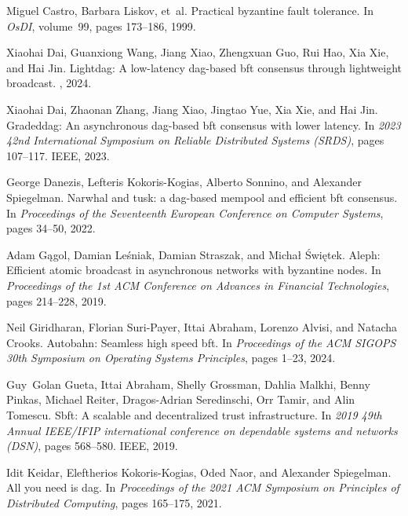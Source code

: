\begin{thebibliography}{10}
Miguel Castro, Barbara Liskov, et~al.
\newblock Practical byzantine fault tolerance.
\newblock In {\em OsDI}, volume~99, pages 173--186, 1999.

Xiaohai Dai, Guanxiong Wang, Jiang Xiao, Zhengxuan Guo, Rui Hao, Xia Xie, and
  Hai Jin.
\newblock Lightdag: A low-latency dag-based bft consensus through lightweight
  broadcast.
, 2024.

Xiaohai Dai, Zhaonan Zhang, Jiang Xiao, Jingtao Yue, Xia Xie, and Hai Jin.
\newblock Gradeddag: An asynchronous dag-based bft consensus with lower
  latency.
\newblock In {\em 2023 42nd International Symposium on Reliable Distributed
  Systems (SRDS)}, pages 107--117. IEEE, 2023.

George Danezis, Lefteris Kokoris-Kogias, Alberto Sonnino, and Alexander
  Spiegelman.
\newblock Narwhal and tusk: a dag-based mempool and efficient bft consensus.
\newblock In {\em Proceedings of the Seventeenth European Conference on
  Computer Systems}, pages 34--50, 2022.

Adam G{\k{a}}gol, Damian Le{\'s}niak, Damian Straszak, and Micha{\l}
  {\'S}wi{\k{e}}tek.
\newblock Aleph: Efficient atomic broadcast in asynchronous networks with
  byzantine nodes.
\newblock In {\em Proceedings of the 1st ACM Conference on Advances in
  Financial Technologies}, pages 214--228, 2019.

Neil Giridharan, Florian Suri-Payer, Ittai Abraham, Lorenzo Alvisi, and Natacha
  Crooks.
\newblock Autobahn: Seamless high speed bft.
\newblock In {\em Proceedings of the ACM SIGOPS 30th Symposium on Operating
  Systems Principles}, pages 1--23, 2024.

Guy~Golan Gueta, Ittai Abraham, Shelly Grossman, Dahlia Malkhi, Benny Pinkas,
  Michael Reiter, Dragos-Adrian Seredinschi, Orr Tamir, and Alin Tomescu.
\newblock Sbft: A scalable and decentralized trust infrastructure.
\newblock In {\em 2019 49th Annual IEEE/IFIP international conference on
  dependable systems and networks (DSN)}, pages 568--580. IEEE, 2019.

Idit Keidar, Eleftherios Kokoris-Kogias, Oded Naor, and Alexander Spiegelman.
\newblock All you need is dag.
\newblock In {\em Proceedings of the 2021 ACM Symposium on Principles of
  Distributed Computing}, pages 165--175, 2021.


\end{thebibliography}

